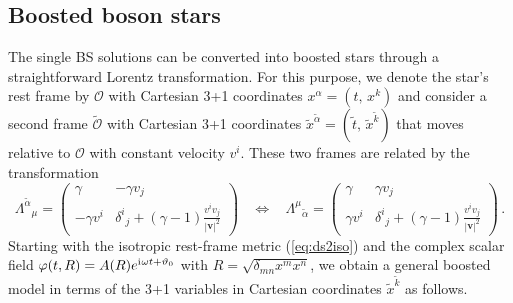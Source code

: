 \documentclass[]{iopart}
\renewcommand{\vec}[1]{\boldsymbol{#1}}
\newcommand{\iu}{\mathrm{i}\mkern1mu}
\begin{document}
\subsection{Boosted boson stars}
%
The single BS solutions can be converted into boosted stars through
a straightforward Lorentz transformation. For this purpose, we denote
the star's rest frame by $\mathcal{O}$ with Cartesian
3+1 coordinates $x^{\alpha}=(t,\,x^k)$
and consider a second frame $\tilde{\mathcal{O}}$ with Cartesian 3+1 coordinates
$\tilde{x}^{\tilde{\alpha}}=(\tilde{t},\,\tilde{x}^{\tilde{k}})$
that moves relative to $\mathcal{O}$ with
constant velocity $v^i$. These two frames are related by the transformation
%
\begin{equation}
  \Lambda^{\tilde{\alpha}}{}_{\mu} = \left( \begin{array}{c|c}
        \gamma & -\gamma v_j \\
        \hline
        -\gamma v^i & \delta^i{}_j+(\gamma-1)\frac{v^i v_j}{|\vec{v}|^2}
  \end{array} \right)~~~~\Leftrightarrow~~~~
  \Lambda^{\mu}{}_{\tilde{\alpha}} = \left( \begin{array}{c|c}
        \gamma & \gamma v_j \\
        \hline
        \gamma v^i & \delta^i{}_j+(\gamma-1)\frac{v^i v_j}{|\vec{v}|^2}
  \end{array} \right)
  \,.
  \nonumber%
\end{equation}
%
Starting with the isotropic rest-frame metric (\ref{eq:ds2iso})
and the complex scalar field
$\varphi(t,R)=A(R)e^{\iu \omega t + \vartheta_0}$ with $R=\sqrt{\delta_{mn}x^mx^n}$,
we obtain a general boosted model in terms of the 3+1 variables
in Cartesian coordinates $\tilde{x}^{\tilde{k}}$ as follows.
%
\end{document}
